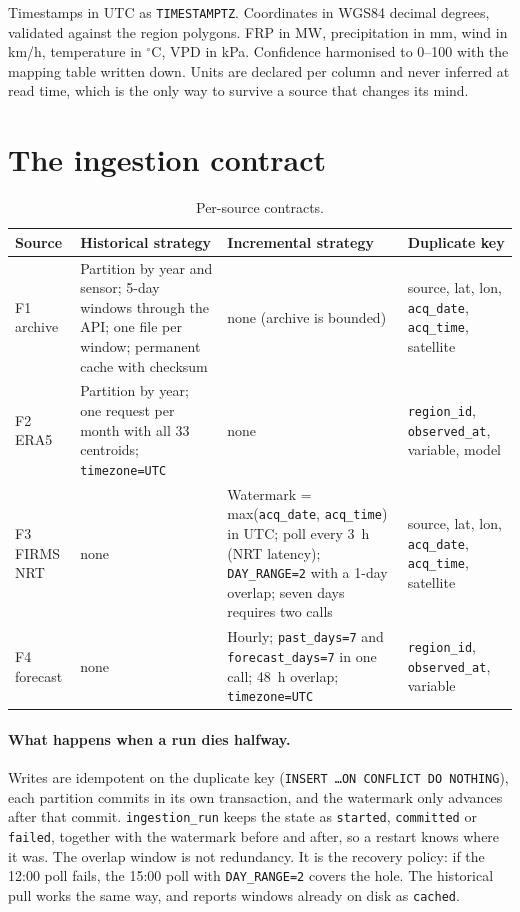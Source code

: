 \documentclass[11pt,a4paper]{article}
\newcommand{\code}[1]{\texttt{\small #1}}
\begin{document}
Timestamps in UTC as \code{TIMESTAMPTZ}. Coordinates in WGS84 decimal degrees, validated against the
region polygons. FRP in MW, precipitation in mm, wind in km/h, temperature in $^\circ$C, VPD in kPa.
Confidence harmonised to 0--100 with the mapping table written down. Units are declared per column
and never inferred at read time, which is the only way to survive a source that changes its mind.

\section{The ingestion contract}\label{sec:contract}

\begin{table}[h]
\centering
\small
\begin{tabular}{L{2.3cm}L{4.2cm}L{4.4cm}L{4.0cm}}
\toprule
\textbf{Source} & \textbf{Historical strategy} & \textbf{Incremental strategy} & \textbf{Duplicate key} \\
\midrule
F1 archive & Partition by year and sensor; 5-day windows through the API; one file per window; permanent cache with checksum & none (archive is bounded) & source, lat, lon, \code{acq\_date}, \code{acq\_time}, satellite \\
F2 ERA5 & Partition by year; one request per month with all 33 centroids; \code{timezone=UTC} & none & \code{region\_id}, \code{observed\_at}, variable, model \\
F3 FIRMS NRT & none & Watermark = max(\code{acq\_date}, \code{acq\_time}) in UTC; poll every 3~h (NRT latency); \code{DAY\_RANGE=2} with a 1-day overlap; seven days requires two calls & source, lat, lon, \code{acq\_date}, \code{acq\_time}, satellite \\
F4 forecast & none & Hourly; \code{past\_days=7} and \code{forecast\_days=7} in one call; 48~h overlap; \code{timezone=UTC} & \code{region\_id}, \code{observed\_at}, variable \\
\bottomrule
\end{tabular}
\caption{Per-source contracts.}
\end{table}

\paragraph{What happens when a run dies halfway.} Writes are idempotent on the duplicate key
(\code{INSERT \ldots ON CONFLICT DO NOTHING}), each partition commits in its own transaction, and the
watermark only advances after that commit. \code{ingestion\_run} keeps the state as
\code{started}, \code{committed} or \code{failed}, together with the watermark before and after, so a
restart knows where it was. The overlap window is not redundancy. It is the recovery policy: if the
12:00 poll fails, the 15:00 poll with \code{DAY\_RANGE=2} covers the hole. The historical pull works
the same way, and reports windows already on disk as \code{cached}.
\end{document}
